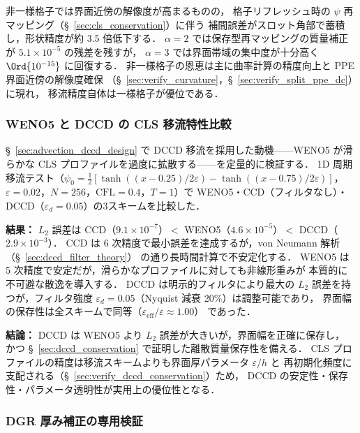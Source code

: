 非一様格子では界面近傍の解像度が高まるものの，
格子リフレッシュ時の $\psi$ 再マッピング（§~\ref{sec:cls_conservation}）に伴う
補間誤差がスロット角部で蓄積し，形状精度が約 3.5 倍低下する．
$\alpha = 2$ では保存型再マッピングの質量補正が $5.1 \times 10^{-5}$ の残差を残すが，
$\alpha = 3$ では界面帯域の集中度が十分高く
$\Ord{10^{-15}}$ に回復する．
非一様格子の恩恵は主に曲率計算の精度向上と PPE 界面近傍の解像度確保
（§~\ref{sec:verify_curvature}，§~\ref{sec:verify_split_ppe_dc}）に現れ，
移流精度自体は一様格子が優位である．


\subsubsection{WENO5 と DCCD の CLS 移流特性比較}
\label{sec:verify_weno5_vs_dccd}

§~\ref{sec:advection_dccd_design} で DCCD 移流を採用した動機——WENO5 が滑らかな CLS
プロファイルを過度に拡散する——を定量的に検証する．
1D 周期移流テスト（$\psi_0 = \tfrac{1}{2}[\tanh((x{-}0.25)/2\varepsilon) - \tanh((x{-}0.75)/2\varepsilon)]$，
$\varepsilon = 0.02$，$N = 256$，$\mathrm{CFL} = 0.4$，$T = 1$）で
WENO5・CCD（フィルタなし）・DCCD（$\varepsilon_d = 0.05$）の3スキームを比較した．

\noindent\textbf{結果：}
$L_2$ 誤差は CCD（$9.1 \times 10^{-7}$）$<$ WENO5（$4.6 \times 10^{-5}$）$<$
DCCD（$2.9 \times 10^{-3}$）．
CCD は 6 次精度で最小誤差を達成するが，von Neumann 解析（§~\ref{sec:dccd_filter_theory}）
の通り長時間計算で不安定化する．
WENO5 は 5 次精度で安定だが，滑らかなプロファイルに対しても非線形重みが
本質的に不可避な散逸を導入する．
DCCD は明示的フィルタにより最大の $L_2$ 誤差を持つが，フィルタ強度
$\varepsilon_d = 0.05$（Nyquist 減衰 20\%）は調整可能であり，
界面幅の保存性は全スキームで同等（$\varepsilon_{\mathrm{eff}}/\varepsilon \approx 1.00$）
であった．

\noindent\textbf{結論：}
DCCD は WENO5 より $L_2$ 誤差が大きいが，界面幅を正確に保存し，
かつ §~\ref{sec:dccd_conservation} で証明した離散質量保存性を備える．
CLS プロファイルの精度は移流スキームよりも界面厚パラメータ $\varepsilon/h$ と
再初期化頻度に支配される（§~\ref{sec:verify_dccd_conservation}）ため，
DCCD の安定性・保存性・パラメータ透明性が実用上の優位性となる．

\subsubsection{DGR 厚み補正の専用検証}
\label{sec:verify_dgr}

